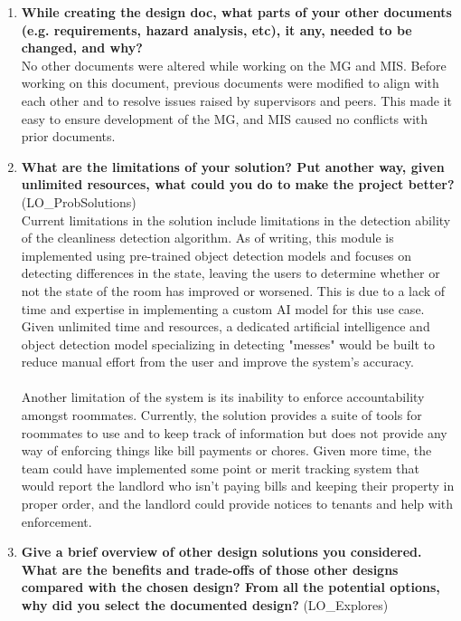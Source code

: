 \documentclass[12pt, titlepage]{article}
\begin{document}
\begin{enumerate}
  \item \textbf{While creating the design doc, what parts of your other documents (e.g.
  requirements, hazard analysis, etc), it any, needed to be changed, and why?}\\
  No other documents were altered while working on the MG and MIS. Before working on this document, previous documents were modified to align with each other and to resolve issues raised by supervisors and peers. This made it easy to ensure development of the MG, and MIS caused no conflicts with prior documents. 
  \item \textbf{What are the limitations of your solution?  Put another way, given
  unlimited resources, what could you do to make the project better?} (LO\_ProbSolutions)\\
  Current limitations in the solution include limitations in the detection ability of the cleanliness detection algorithm. As of writing, this module is implemented using pre-trained object detection models and focuses on detecting differences in the state, leaving the users to determine whether or not the state of the room has improved or worsened. This is due to a lack of time and expertise in implementing a custom AI model for this use case. Given unlimited time and resources, a dedicated artificial intelligence and object detection model specializing in detecting "messes" would be built to reduce manual effort from the user and improve the system's accuracy.\\\\
  Another limitation of the system is its inability to enforce accountability amongst roommates. Currently, the solution provides a suite of tools for roommates to use and to keep track of information but does not provide any way of enforcing things like bill payments or chores. Given more time, the team could have implemented some point or merit tracking system that would report the landlord who isn't paying bills and keeping their property in proper order, and the landlord could provide notices to tenants and help with enforcement.
  \item \textbf{Give a brief overview of other design solutions you considered.  What
  are the benefits and trade-offs of those other designs compared with the chosen
  design?  From all the potential options, why did you select the documented design?}
  (LO\_Explores)\\

\end{enumerate}
\end{document}

